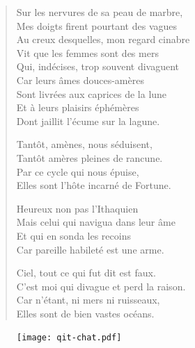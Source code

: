 \begin{verse}\quatrain\neuvain
  Sur les nervures de sa peau de marbre,\\ 
  Mes doigts firent pourtant des vagues\\ 
  Au creux desquelles, mon regard cinabre\\ 
  Vit que les femmes sont des mers\\ 
  Qui, indécises, trop souvent divaguent\\ 
  Car leurs âmes douces-amères\\ 
  Sont livrées aux caprices de la lune\\ 
  Et à leurs plaisirs éphémères\\ 
  Dont jaillit l’écume sur la lagune.  %

  Tantôt, amènes, nous séduisent,\\ 
  Tantôt amères pleines de rancune.\\ 
  Par ce cycle qui nous épuise,\\ 
  Elles sont l’hôte incarné de Fortune.  %

  Heureux non pas l’Ithaquien%
  \label{foot.ithaquien}\\  %
  Mais celui qui navigua dans leur âme\\ 
  Et qui en sonda les recoins\\ 
  Car pareille habileté est une arme.  %

  Ciel, tout ce qui fut dit est faux.\\ 
  C’est moi qui divague et perd la raison.\\ 
  Car n’étant, ni mers ni ruisseaux,\\ 
  Elles sont de bien vastes océans.  %
\end{verse}

\begin{figure}[h]
  \centering
  \texttt{[image: qit-chat.pdf]}
  \captionsetup{labelformat=empty}
  \caption[Idéotexte du  (\textarabic{قط})]{}
\end{figure}



